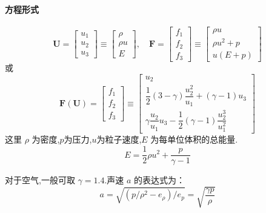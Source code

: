 \documentclass{book}
\begin{document}
\paragraph{方程形式}
\begin{equation}
    \mathbf{U}=\left[\begin{array}{l}
            u_{1} \\
            u_{2} \\
            u_{3}
        \end{array}\right] \equiv\left[\begin{array}{c}
            \rho   \\
            \rho u \\
            E
        \end{array}\right], \quad \mathbf{F}=\left[\begin{array}{c}
            f_{1} \\
            f_{2} \\
            f_{3}
        \end{array}\right] \equiv\left[\begin{array}{c}
            \rho u       \\
            \rho u^{2}+p \\
            u(E+p)
        \end{array}\right]
\end{equation}
或
\begin{equation}
    \mathbf{F}(\mathbf{U})=\left[\begin{array}{l}
            f_{1} \\
            f_{2} \\
            f_{3}
        \end{array}\right] \equiv\left[\begin{array}{c}
            u_{2}                                                            \\
            \dfrac{1}{2}(3-\gamma) \dfrac{u_{2}^{2}}{u_{1}}+(\gamma-1) u_{3} \\
            \gamma \dfrac{u_{2}}{u_{1}} u_{3}-\dfrac{1}{2}(\gamma-1) \dfrac{u_{2}^{3}}{u_{1}^{2}}
        \end{array}\right]
\end{equation}
这里 $\rho$ 为密度,$p$为压力,$u$为粒子速度,$E$ 为每单位体积的总能量.
\begin{equation}
    E=\dfrac{1}{2}\rho u^{2}+\frac{p}{\gamma-1}
\end{equation}

对于空气,一般可取 $\gamma=1.4$.声速 $a$ 的表达式为：
\begin{equation}
    a=\sqrt{\left(p / \rho^{2}-e_{\rho}\right) / e_{p}}=\sqrt{\dfrac{\gamma p}{\rho}}
\end{equation}
\end{document}
